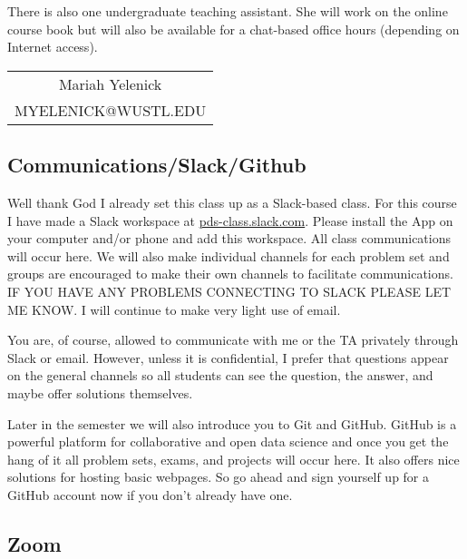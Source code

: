 \documentclass[11pt]{article}
\begin{document}
There is also one undergraduate teaching assistant. She will work on the online course book but will also be available for a chat-based office hours (depending on Internet access).  
\vspace{.2cm}

\begin{center}
\begin{small}
\begin{tabular}{c}
Mariah Yelenick \\
MYELENICK@WUSTL.EDU\\

\end{tabular}
\end{small}
\end{center}

\subsection*{Communications/Slack/Github}

Well thank God I already set this class up as a Slack-based class. For this course I have made a Slack workspace at \url{pds-class.slack.com}.  Please install the App on your computer and/or phone and add this workspace.  All class communications will occur here. We will also make individual channels for each problem set and groups are encouraged to make their own channels to facilitate communications.  IF YOU HAVE ANY PROBLEMS CONNECTING TO SLACK PLEASE LET ME KNOW.  I will continue to make very light use of email.

You are, of course, allowed to communicate with me or the TA privately through Slack or email.  However, unless it is confidential, I prefer that questions appear on the general channels so all students can see the question, the answer, and maybe offer solutions themselves.

Later in the semester we will also introduce you to Git and GitHub.  GitHub is a powerful platform for collaborative and open data science and once you get the hang of it all problem sets, exams, and projects will occur here.  It also offers nice solutions for hosting basic webpages.  So go ahead and sign yourself up for a GitHub account now if you don't already have one.



\subsection*{Zoom}
\end{document}
